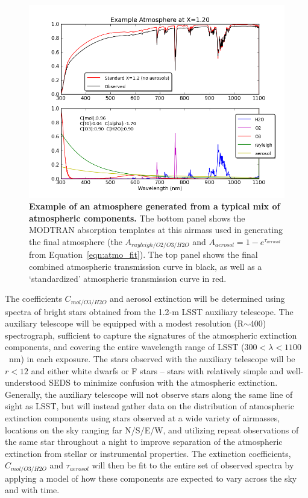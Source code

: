 \documentclass[12pt,preprint]{aastex}
\begin{document}
\begin{figure}
\centering
\includegraphics[width=6in]{atmo_airmass12}
\caption{{\small
{\bf Example of an atmosphere generated from a typical mix of
atmospheric components.} The bottom panel shows the MODTRAN absorption
templates at this airmass used in generating the final atmosphere
(the $A_{rayleigh/O2/O3/H2O}$ and $A_{aerosol} = 1-e^{\tau_{aerosol}}$ from
Equation~\ref{eqn:atmo_fit}). The top panel shows the final combined atmospheric
transmission curve in black, as well as a `standardized' atmospheric transmission
curve in red.}
\label{fig:absorption_comps2}
}
\end{figure}

The coefficients $C_{mol/O3/H2O}$ and aerosol extinction will be
determined using spectra of bright stars obtained from the 1.2-m LSST
auxiliary telescope. The auxiliary telescope will be equipped with a
modest resolution (R$\sim400$) spectrograph, sufficient to capture the
signatures of the atmospheric extinction components, and covering the
entire wavelength range of LSST ($300<\lambda<1100$~nm) in each
exposure. The stars observed with the auxiliary telescope will be
$r<12$ and either white dwarfs or F stars -- stars with relatively
simple and well-understood SEDS to minimize confusion with the
atmospheric extinction. Generally, the auxiliary telescope will not
observe stars along the same line of sight as LSST, but will instead
gather data on the distribution of atmospheric extinction components
using stars observed at a wide variety of airmasses, locations on the
sky ranging far N/S/E/W, and utilizing repeat observations of the same
star throughout a night to improve separation of the atmospheric
extinction from stellar or instrumental properties. The extinction
coefficients, $C_{mol/O3/H2O}$ and $\tau_{aerosol}$ will then be fit
to the entire set of observed spectra by applying a model of how these
components are expected to vary across the sky and with time. 
\end{document}
